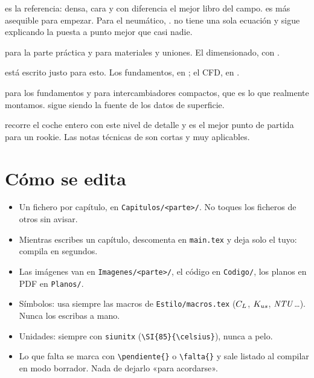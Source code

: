 \begin{description}[leftmargin=0pt,labelsep=0pt,style=nextline]
  \item[Dinámica vehicular] \textcite{milliken_rcvd_1995} es la referencia: densa,
    cara y con diferencia el mejor libro del campo. \textcite{gillespie_fundamentals_1992}
    es más asequible para empezar. Para el neumático,
    \textcite{pacejka_tirevehicle_2012}. \textcite{smith_tunetowin_1978} no tiene
    una sola ecuación y sigue explicando la puesta a punto mejor que casi nadie.
  \item[Suspensión y estructuras] \textcite{staniforth_suspension_2006} para la
    parte práctica y \textcite{smith_engineertowin_1984} para materiales y
    uniones. El dimensionado, con \textcite{budynas_shigley_2020}.
  \item[Aerodinámica] \textcite{katz_racecaraero_1995} está escrito justo para
    esto. Los fundamentos, en \textcite{anderson_aerodynamics_2017}; el CFD, en
    \textcite{versteeg_cfd_2007}.
  \item[Refrigeración] \textcite{incropera_heat_2011} para los fundamentos y
    \textcite{hesselgreaves_compact_2017} para intercambiadores compactos, que es
    lo que realmente montamos. \textcite{kays_london_1984} sigue siendo la fuente
    de los datos de superficie.
  \item[Formula Student] \textcite{seward_racecardesign_2014} recorre el coche
    entero con este nivel de detalle y es el mejor punto de partida para un
    rookie. Las notas técnicas de \textcite{optimumg_tips} son cortas y muy
    aplicables.
\end{description}

\section*{Cómo se edita}

\begin{itemize}
  \item Un fichero por capítulo, en \texttt{Capitulos/<parte>/}. No toques los
        ficheros de otros sin avisar.
  \item Mientras escribes un capítulo, descomenta \verb|| en
        \texttt{main.tex} y deja solo el tuyo: compila en segundos.
  \item Las imágenes van en \texttt{Imagenes/<parte>/}, el código en
        \texttt{Codigo/}, los planos en PDF en \texttt{Planos/}.
  \item Símbolos: usa siempre las macros de \texttt{Estilo/macros.tex}
        ($C_L$, $K_{us}$, $\mathit{NTU}$\ldots). Nunca los escribas a mano.
  \item Unidades: siempre con \texttt{siunitx} (\verb|\SI{85}{\celsius}|),
        nunca a pelo.
  \item Lo que falta se marca con \verb|\pendiente{}| o \verb|\falta{}| y sale
        listado al compilar en modo borrador. Nada de dejarlo «para acordarse».
\end{itemize}
